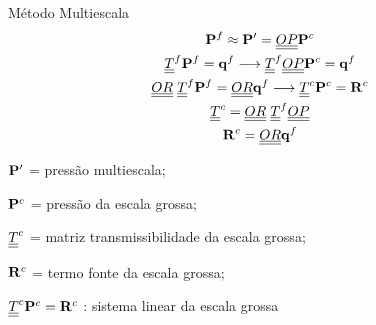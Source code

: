 \documentclass[professionalfont]{beamer}
\begin{document}
\begin{frame}{Método Multiescala}
    \small
    \begin{gather*}
        \mathbf{P}^{f} \approx \bold{P}' = \underline{\underline{OP}} \bold{P}^{c} \\
        \underline{\underline{T}}^{f} \mathbf{P}^{f} = \mathbf{q}^{f}  \longrightarrow \underline{\underline{T}}^{f} \underline{\underline{OP}} \bold{P}^{c} = \mathbf{q}^{f} \\
        \underline{\underline{OR}} \hspace{0.1cm} \underline{\underline{T}}^{f} \mathbf{P}^{f} = \underline{\underline{OR}} \mathbf{q}^{f}  \longrightarrow \underline{\underline{T}}^{c} \bold{P}^{c} = \bold{R}^{c} \\
        \underline{\underline{T}}^{c} = \underline{\underline{OR}} \hspace{0.1cm} \underline{\underline{T}}^{f} \underline{\underline{OP}} \\
        \bold{R}^{c} = \underline{\underline{OR}} \mathbf{q}^{f}
    \end{gather*}

    \begin{description}[]
        \item $\bold{P}'$ = pressão multiescala;
        \item $\bold{P}^{c}$ = pressão da escala grossa;
        \item $\underline{\underline{T}}^{c}$ = matriz transmissibilidade da escala grossa;
        \item $\bold{R}^{c}$ = termo fonte da escala grossa;
        \item $\underline{\underline{T}}^{c} \bold{P}^{c} = \bold{R}^{c}$ : sistema linear da escala grossa
    \end{description}
\end{frame}

    
    
    
\end{document}
